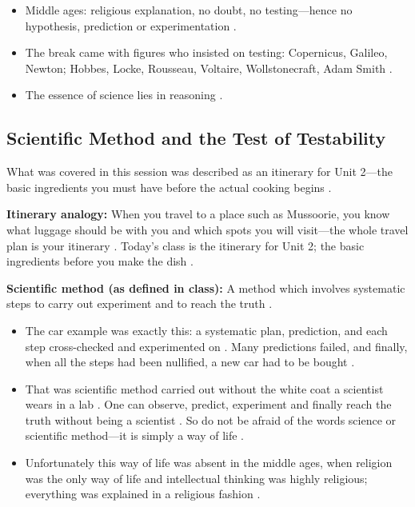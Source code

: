\begin{QuickRevision}
\begin{itemize}
    \item Middle ages: religious explanation, no doubt, no testing---hence no hypothesis, prediction or experimentation .
    \item The break came with figures who insisted on testing: Copernicus, Galileo, Newton; Hobbes, Locke, Rousseau, Voltaire, Wollstonecraft, Adam Smith .
    \item The essence of science lies in reasoning .
\end{itemize}
\end{QuickRevision}

\subsection{Scientific Method and the Test of Testability}
What was covered in this session was described as an itinerary for Unit 2---the basic ingredients you must have before the actual cooking begins .

\begin{ExampleBox}
\textbf{Itinerary analogy:} When you travel to a place such as Mussoorie, you know what luggage should be with you and which spots you will visit---the whole travel plan is your itinerary . Today's class is the itinerary for Unit 2; the basic ingredients before you make the dish .
\end{ExampleBox}

\begin{KeyConcept}
\textbf{Scientific method (as defined in class):} A method which involves systematic steps to carry out experiment and to reach the truth .
\begin{itemize}
    \item The car example was exactly this: a systematic plan, prediction, and each step cross-checked and experimented on . Many predictions failed, and finally, when all the steps had been nullified, a new car had to be bought .
    \item That was scientific method carried out without the white coat a scientist wears in a lab . One can observe, predict, experiment and finally reach the truth without being a scientist . So do not be afraid of the words science or scientific method---it is simply a way of life .
    \item Unfortunately this way of life was absent in the middle ages, when religion was the only way of life and intellectual thinking was highly religious; everything was explained in a religious fashion .
\end{itemize}
\end{KeyConcept}

